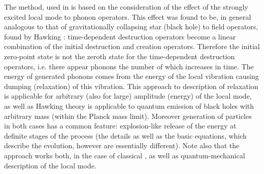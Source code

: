 The method, used in \cite{hizhrev,procest,hizhnev} is based on the 
consideration of the effect of the strongly excited local mode to phonon 
operators. This effect was found to be, in general analogous to that of 
gravitationally collapsing star (black hole) to field operators, found by 
Hawking \cite{hawking}: time-dependent destruction operators become a linear 
combination of the initial destruction and creation operators. Therefore the 
initial zero-point state is not the zeroth state for the time-dependent 
destruction operators, i.e. there appear phonons the number of which increases
in time. The energy of generated phonons comes from the energy of the local 
vibration causing dumping (relaxation) of this vibration. This approach to 
description of relaxation is applicable for arbitrary (also for large) 
amplitude (energy) of the local mode, as well as  Hawking theory 
\cite{hawking} is applicable to quantum emission of black holes with arbitrary 
mass (within the Planck mass limit). Moreover generation of particles in 
both cases has a common feature: explosion-like release of the energy at 
definite stages of the process (the details as well as the basic equations, 
which describe the evolution, however are essentially different). Note also 
that the approach works  both, in the case of classical 
\cite{hizhrev,procest,hizhnev}, as well as quantum-mechanical description 
of the local mode. 

